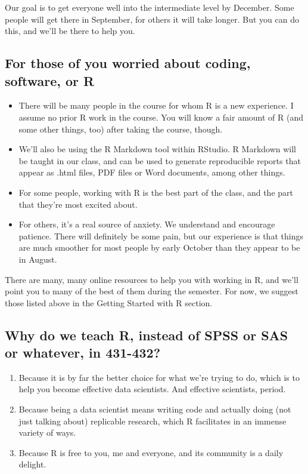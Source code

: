 \documentclass[
]{book}
\providecommand{\tightlist}{%
  \setlength{\itemsep}{0pt}\setlength{\parskip}{0pt}}
\begin{document}
Our goal is to get everyone well into the intermediate level by December. Some people will get there in September, for others it will take longer. But you can do this, and we'll be there to help you.

\hypertarget{for-those-of-you-worried-about-coding-software-or-r}{%
\subsection{For those of you worried about coding, software, or R}\label{for-those-of-you-worried-about-coding-software-or-r}}

\begin{itemize}
\tightlist
\item
  There will be many people in the course for whom R is a new experience. I assume no prior R work in the course. You will know a fair amount of R (and some other things, too) after taking the course, though.
\item
  We'll also be using the R Markdown tool within RStudio. R Markdown will be taught in our class, and can be used to generate reproducible reports that appear as .html files, PDF files or Word documents, among other things.
\item
  For some people, working with R is the best part of the class, and the part that they're most excited about.
\item
  For others, it's a real source of anxiety. We understand and encourage patience. There will definitely be some pain, but our experience is that things are much smoother for most people by early October than they appear to be in August.
\end{itemize}

There are many, many online resources to help you with working in R, and we'll point you to many of the best of them during the semester. For now, we suggest those listed above in the Getting Started with R section.

\hypertarget{why-do-we-teach-r-instead-of-spss-or-sas-or-whatever-in-431-432-1}{%
\subsection{Why do we teach R, instead of SPSS or SAS or whatever, in 431-432?}\label{why-do-we-teach-r-instead-of-spss-or-sas-or-whatever-in-431-432-1}}

\begin{enumerate}
\def\labelenumi{\arabic{enumi}.}
\tightlist
\item
  Because it is by far the better choice for what we're trying to do, which is to help you become effective data scientists. And effective scientists, period.
\item
  Because being a data scientist means writing code and actually doing (not just talking about) replicable research, which R facilitates in an immense variety of ways.
\item
  Because R is free to you, me and everyone, and its community is a daily delight.
\end{enumerate}
\end{document}
